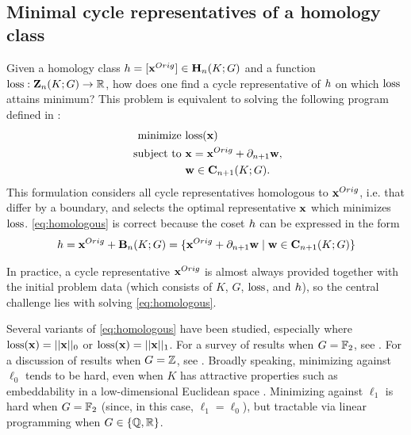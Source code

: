 \\

\DIFaddend \subsection{Minimal cycle representatives of a homology class} \label{singlecyclecase}


Given a homology class $h =[\mathbf{x}^{Orig}] \in \mathbf{H}_n(K; G)$ and a function $\mathrm{loss}: \mathbf{Z}_n(K;G) \to \mathbb{R}$, how does one find a cycle representative of $h$ on which $\mathrm{loss}$ attains minimum?  This problem is equivalent to  solving the following program defined in \cite{dey2011optimal}:
\begin{align}
   \begin{split}
    \text{minimize } & \mathrm{loss}(\mathbf{x}) \\
    \text{ subject to } & \mathbf{x} = \mathbf{x}^{Orig} + \partial_{n+1} \mathbf{w}, \\
    & \mathbf{w} \in \mathbf{C}_{n+1}(K; G).
   \end{split}
   \label{eq:homologous}
\end{align}
This formulation considers all cycle representatives homologous to $\mathbf{x}^{Orig}$, i.e. that differ by a boundary, and selects the optimal representative $\mathbf{x}$ which minimizes $\mathrm{loss}$.
\pr \eqref{eq:homologous} is correct because the coset $h$ can be expressed in the form
    \begin{align*}
    h
    =
    \mathbf{x}^{Orig} + \mathbf{B}_n(K; G) 
    =
    \{ \mathbf{x}^{Orig} + \partial_{n+1} \mathbf{w} \mid \mathbf{w} \in \mathbf{C}_{n+1}(K; G) \}
    \end{align*}  

In practice, a cycle representative $\mathbf{x}^{Orig}$ is almost always provided together with the initial problem data (which consists of $K$, $G$, $\mathrm{loss}$, and $h$), so the central challenge lies with solving \pr \eqref{eq:homologous}.



Several variants of \pr \eqref{eq:homologous} have been studied, especially where $\mathrm{loss}(\mathbf{x}) = ||\mathbf{x}||_0$ or $\mathrm{loss}(\mathbf{x}) = ||\mathbf{x}||_1$.  For a survey of results when $G = \mathbb{F}_2$, see \cite{chenhardness}.  For a discussion of results when $G = \mathbb{Z}$, see \cite{dey2011optimal}.  Broadly  speaking, minimizing against $\ell_0$  tends to be hard, even when $K$ has attractive properties such as embeddability in a low-dimensional Euclidean space \cite{borradaile2020minimum}.  Minimizing against $\ell_1$  is hard when $G = \mathbb{F}_2$ (since, in this case, $\ell_1 = \ell_0$),  but tractable via linear programming when $G \in \{\mathbb{Q}, \mathbb{R}\}$.  


